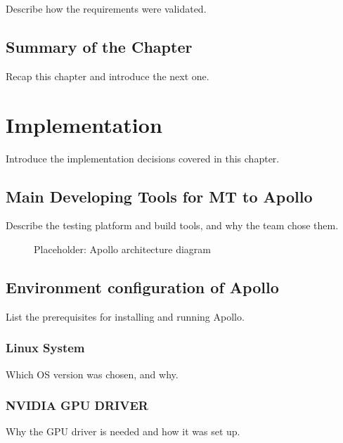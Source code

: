 \documentclass[
  12pt,
  a4paper,
]{report}
\begin{document}
Describe how the requirements were validated.

\section{Summary of the Chapter}\label{summary-of-the-chapter-1}

Recap this chapter and introduce the next one.

\chapter{Implementation}\label{implementation}

Introduce the implementation decisions covered in this chapter.

\section{Main Developing Tools for MT to
Apollo}\label{main-developing-tools-for-mt-to-apollo}

Describe the testing platform and build tools, and why the team chose
them.

\begin{figure}
\centering
{}
\caption{Placeholder: Apollo architecture diagram}
\end{figure}

\section{Environment configuration of
Apollo}\label{environment-configuration-of-apollo}

List the prerequisites for installing and running Apollo.

\subsection{Linux System}\label{linux-system}

Which OS version was chosen, and why.

\subsection{NVIDIA GPU DRIVER}\label{nvidia-gpu-driver}

Why the GPU driver is needed and how it was set up.
\end{document}
